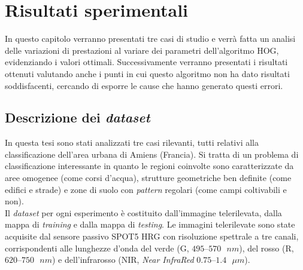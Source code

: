 \chapter{Risultati sperimentali} %

\label{cap:risultati} %



In questo capitolo verranno presentati tre casi di studio e verrà fatta un analisi delle variazioni di prestazioni al variare dei parametri dell’algoritmo  HOG, evidenziando i valori ottimali. 
Successivamente verranno presentati i risultati ottenuti valutando anche i punti in cui questo algoritmo non ha dato risultati soddisfacenti, cercando di esporre le cause che hanno generato questi errori.

\clearpage

\section{Descrizione dei \emph{dataset}}
In questa tesi sono stati analizzati tre casi rilevanti, tutti relativi alla classificazione dell'area urbana di Amiens (Francia).  Si tratta di un problema di classificazione interessante in quanto le regioni coinvolte sono caratterizzate da aree omogenee (come corsi d'acqua), strutture geometriche ben definite (come edifici e strade) e zone di suolo con\emph{ pattern} regolari (come campi coltivabili e non).\\
Il \emph{dataset} per ogni esperimento è costituito dall'immagine telerilevata, dalla mappa di \emph{training} e dalla mappa di \emph{testing}.
Le immagini telerilevate sono state acquisite dal sensore passivo \textsc{SPOT5 HRG} con risoluzione spettrale a tre canali, corrispondenti alle lunghezze d'onda del verde (G, $495–570\text{ } nm$), del rosso (R, $620–750\text{ } nm$) e dell'infrarosso (NIR, \emph{Near InfraRed} $0.75–1.4\text{ } \mu m$).
 

